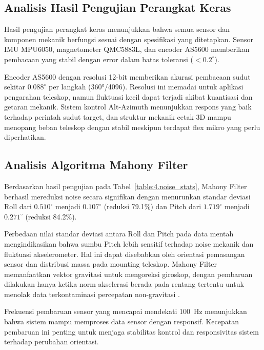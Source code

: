 \subsection{Analisis Hasil Pengujian Perangkat Keras} \label{IV.AnalisisHardware}
Hasil pengujian perangkat keras menunjukkan bahwa semua sensor dan komponen mekanik berfungsi sesuai dengan spesifikasi yang ditetapkan. Sensor IMU MPU6050, magnetometer QMC5883L, dan encoder AS5600 memberikan pembacaan yang stabil dengan error dalam batas toleransi ($< 0.2^\circ$). \par

Encoder AS5600 dengan resolusi 12-bit memberikan akurasi pembacaan sudut sekitar $0.088^\circ$ per langkah (360°/4096). Resolusi ini memadai untuk aplikasi pengarahan teleskop, namun fluktuasi kecil dapat terjadi akibat kuantisasi dan getaran mekanik. Sistem kontrol Alt-Azimuth menunjukkan respons yang baik terhadap perintah sudut target, dan struktur mekanik cetak 3D mampu menopang beban teleskop dengan stabil meskipun terdapat flex mikro yang perlu diperhatikan. \par

\subsection{Analisis Algoritma Mahony Filter} \label{IV.AnalisisMahony}
Berdasarkan hasil pengujian pada Tabel~\ref{table:4.noise_stats}, Mahony Filter berhasil mereduksi noise secara signifikan dengan menurunkan standar deviasi Roll dari $0.510^\circ$ menjadi $0.107^\circ$ (reduksi 79.1\%) dan Pitch dari $1.719^\circ$ menjadi $0.271^\circ$ (reduksi 84.2\%). \par

Perbedaan nilai standar deviasi antara Roll dan Pitch pada data mentah mengindikasikan bahwa sumbu Pitch lebih sensitif terhadap noise mekanik dan fluktuasi akselerometer. Hal ini dapat disebabkan oleh orientasi pemasangan sensor dan distribusi massa pada mounting teleskop. Mahony Filter memanfaatkan vektor gravitasi untuk mengoreksi giroskop, dengan pembaruan dilakukan hanya ketika norm akselerasi berada pada rentang tertentu untuk menolak data terkontaminasi percepatan non-gravitasi \cite{Mahony2007,Alfian2021}. \par

Frekuensi pembaruan sensor yang mencapai mendekati 100~Hz menunjukkan bahwa sistem mampu memproses data sensor dengan responsif. Kecepatan pembaruan ini penting untuk menjaga stabilitas kontrol dan responsivitas sistem terhadap perubahan orientasi. \par

